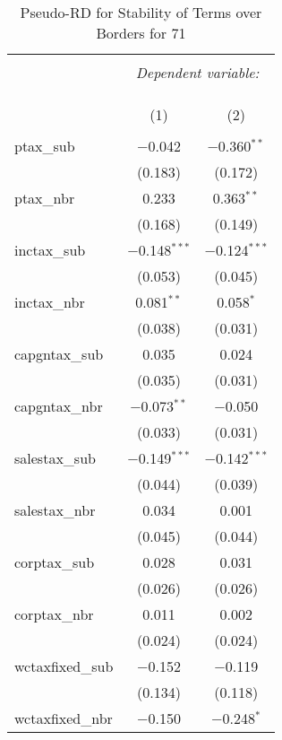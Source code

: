 
\begin{table}[!htbp] \centering 
  \caption{Pseudo-RD for Stability of Terms over Borders for  71} 
  \label{} 
\begin{tabular}{@{\extracolsep{5pt}}lcc} 
\\[-1.8ex]\hline 
\hline \\[-1.8ex] 
 & \multicolumn{2}{c}{\textit{Dependent variable:}} \\ 
\cline{2-3} 
\\[-1.8ex] & \multicolumn{2}{c}{ } \\ 
\\[-1.8ex] & (1) & (2)\\ 
\hline \\[-1.8ex] 
 ptax\_sub & $-$0.042 & $-$0.360$^{**}$ \\ 
  & (0.183) & (0.172) \\ 
  ptax\_nbr & 0.233 & 0.363$^{**}$ \\ 
  & (0.168) & (0.149) \\ 
  inctax\_sub & $-$0.148$^{***}$ & $-$0.124$^{***}$ \\ 
  & (0.053) & (0.045) \\ 
  inctax\_nbr & 0.081$^{**}$ & 0.058$^{*}$ \\ 
  & (0.038) & (0.031) \\ 
  capgntax\_sub & 0.035 & 0.024 \\ 
  & (0.035) & (0.031) \\ 
  capgntax\_nbr & $-$0.073$^{**}$ & $-$0.050 \\ 
  & (0.033) & (0.031) \\ 
  salestax\_sub & $-$0.149$^{***}$ & $-$0.142$^{***}$ \\ 
  & (0.044) & (0.039) \\ 
  salestax\_nbr & 0.034 & 0.001 \\ 
  & (0.045) & (0.044) \\ 
  corptax\_sub & 0.028 & 0.031 \\ 
  & (0.026) & (0.026) \\ 
  corptax\_nbr & 0.011 & 0.002 \\ 
  & (0.024) & (0.024) \\ 
  wctaxfixed\_sub & $-$0.152 & $-$0.119 \\ 
  & (0.134) & (0.118) \\ 
  wctaxfixed\_nbr & $-$0.150 & $-$0.248$^{*}$ \\ 

\end{tabular}
\end{table}
